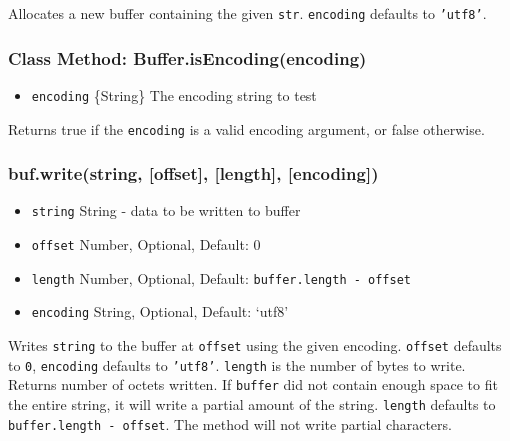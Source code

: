 Allocates a new buffer containing the given \texttt{str}.
\texttt{encoding} defaults to \texttt{'utf8'}.

\subsubsection{Class Method: Buffer.isEncoding(encoding)}

\begin{itemize}
\item
  \texttt{encoding} \{String\} The encoding string to test
\end{itemize}

Returns true if the \texttt{encoding} is a valid encoding argument, or
false otherwise.

\subsubsection{buf.write(string, {[}offset{]}, {[}length{]},
{[}encoding{]})}

\begin{itemize}
\item
  \texttt{string} String - data to be written to buffer
\item
  \texttt{offset} Number, Optional, Default: 0
\item
  \texttt{length} Number, Optional, Default:
  \texttt{buffer.length - offset}
\item
  \texttt{encoding} String, Optional, Default: `utf8'
\end{itemize}

Writes \texttt{string} to the buffer at \texttt{offset} using the given
encoding. \texttt{offset} defaults to \texttt{0}, \texttt{encoding}
defaults to \texttt{'utf8'}. \texttt{length} is the number of bytes to
write. Returns number of octets written. If \texttt{buffer} did not
contain enough space to fit the entire string, it will write a partial
amount of the string. \texttt{length} defaults to
\texttt{buffer.length - offset}. The method will not write partial
characters.

\begin{Shaded}
\begin{Highlighting}[]
 \NormalTok{);}
\NormalTok{(}\NormalTok{, }\NormalTok{);}
 \NormalTok{+ }\NormalTok{(}\NormalTok{, }
\end{Highlighting}
\end{Shaded}

